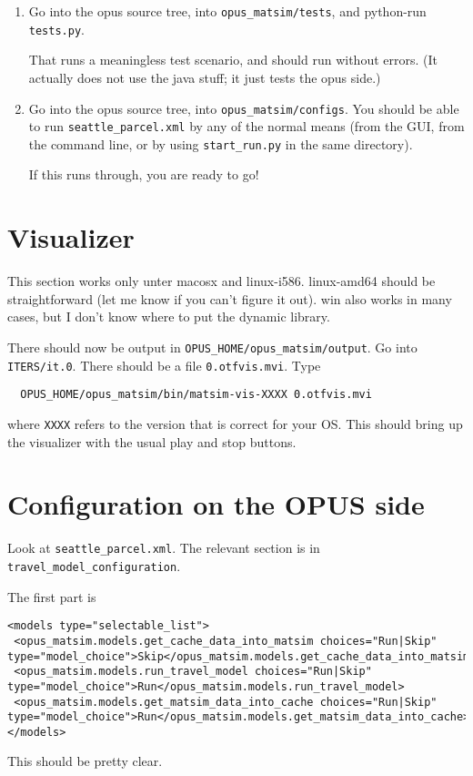 \documentclass{article}
\begin{document}
\begin{enumerate}
\item Go into the opus source tree, into \verb$opus_matsim/tests$, and
python-run \verb$tests.py$.

That runs a meaningless test scenario, and should run without errors.
(It actually does not use the java stuff; it just tests the opus side.)

\item Go into the opus source tree, into \verb$opus_matsim/configs$.
You should be able to run \verb$seattle_parcel.xml$ by any of the
normal means (from the GUI, from the command line, or by using
\verb$start_run.py$ in the same directory).

If this runs through, you are ready to go!

\end{enumerate}

\section{Visualizer}

This section works only unter macosx and linux-i586.  linux-amd64
should be straightforward (let me know if you can't figure it out).
win also works in many cases, but I don't know where to put the
dynamic library.

There should now be output in \verb$OPUS_HOME/opus_matsim/output$.  Go
into \verb$ITERS/it.0$.  There should be a file \verb$0.otfvis.mvi$.
Type
\begin{verbatim}
  OPUS_HOME/opus_matsim/bin/matsim-vis-XXXX 0.otfvis.mvi
\end{verbatim}
where \verb$XXXX$ refers to the version that is correct for your OS.
This should bring up the visualizer with the usual play and stop
buttons.

\section{Configuration on the OPUS side}

Look at \verb$seattle_parcel.xml$. The relevant section is in
\verb$travel_model_configuration$.

The first part is
{\tiny
\begin{verbatim}
<models type="selectable_list">
 <opus_matsim.models.get_cache_data_into_matsim choices="Run|Skip" type="model_choice">Skip</opus_matsim.models.get_cache_data_into_matsim>
 <opus_matsim.models.run_travel_model choices="Run|Skip" type="model_choice">Run</opus_matsim.models.run_travel_model>
 <opus_matsim.models.get_matsim_data_into_cache choices="Run|Skip" type="model_choice">Run</opus_matsim.models.get_matsim_data_into_cache>
</models>
\end{verbatim}
}
This should be pretty clear.
\end{document}
